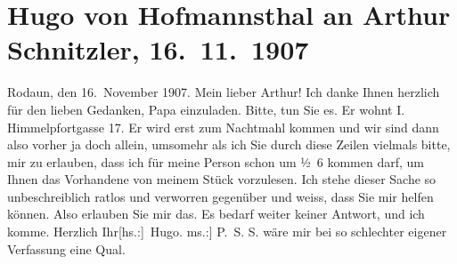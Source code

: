 

         
         \newcommand{\erwaehntePersonen}{Personen: Hugo August von Hofmannsthal, Gustav Schwarzkopf}
         \newcommand{\erwaehnteOrte}{Orte: Himmelpfortgasse, Rodaun, Wien}
         \newcommand{\erwaehnteWerke}{Werke: Silvia im »Stern«}
               \section[Hugo von Hofmannsthal an Arthur Schnitzler, 16. 11. 1907]{ Hugo von Hofmannsthal an Arthur Schnitzler, 16. 11. 1907}\nopagebreak{}\rehead{ }\begin{ledgroupsized}[t]{13cm}\normalsize\beginnumbering \toendnotes[C]{\smallbreak\pagebreak[2]} 
\toendnotes[C]{\smallbreak}\pstart
           \raggedleft{}{\pb}Rodaun, den 16. November
                  1907.\pend
           \pstart{}Mein lieber Arthur!\pend\pstart
           Ich danke Ihnen herzlich für den lieben Gedanken, Papa einzuladen. Bitte, tun Sie es. Er wohnt I. Himmelpfortgasse 17. Er wird erst zum Nachtmahl
               kommen und wir sind dann also vorher ja doch allein, umsomehr als ich Sie durch
               diese Zeilen vielmals bitte, mir zu erlauben, dass ich für meine Person schon um
                  ½ 6 kommen darf, um Ihnen das Vorhandene von meinem Stück vorzulesen. Ich stehe dieser Sache so
               unbeschreiblich ratlos und verworren gegenüber und weiss, dass Sie mir helfen
               können. Also erlauben Sie mir das. Es bedarf weiter keiner Antwort, und ich
               komme.\pend
           \pstart Herzlich Ihr\spacefill\mbox{{[}hs.:{]}  Hugo.}\pend{}\pstart
           \noindent{}{[}ms.:{]} P. S. S. wäre mir bei so schlechter eigener
                  Verfassung eine Qual.\pend
           
         
         \endnumbering{}\end{ledgroupsized}  \newcommand{\dateiname}{L01732}\newcommand{\titel}{Hugo von Hofmannsthal an Arthur Schnitzler, 16. 11. 1907}\newcommand{\editorInnen}{Martin Anton Müller und Gerd-Hermann Susen}
      